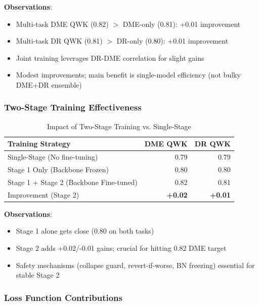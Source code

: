 \textbf{Observations}:
\begin{itemize}
    \item Multi-task DME QWK (0.82) $>$ DME-only (0.81): +0.01 improvement
    \item Multi-task DR QWK (0.81) $>$ DR-only (0.80): +0.01 improvement
    \item Joint training leverages DR-DME correlation for slight gains
    \item Modest improvements; main benefit is single-model efficiency (not bulky DME+DR ensemble)
\end{itemize}

\subsubsection{Two-Stage Training Effectiveness}

\begin{table}[H]
\centering
\small
\caption{Impact of Two-Stage Training vs. Single-Stage}
\begin{tabular}{|l|r|r|}
\hline
\textbf{Training Strategy} & \textbf{DME QWK} & \textbf{DR QWK} \\
\hline
Single-Stage (No fine-tuning) & 0.79 & 0.79 \\
Stage 1 Only (Backbone Frozen) & 0.80 & 0.80 \\
Stage 1 + Stage 2 (Backbone Fine-tuned) & 0.82 & 0.81 \\
Improvement (Stage 2) & \textbf{+0.02} & \textbf{+0.01} \\
\hline
\end{tabular}
\end{table}

\textbf{Observations}:
\begin{itemize}
    \item Stage 1 alone gets close (0.80 on both tasks)
    \item Stage 2 adds +0.02/-0.01 gains; crucial for hitting 0.82 DME target
    \item Safety mechanisms (collapse guard, revert-if-worse, BN freezing) essential for stable Stage 2
\end{itemize}

\subsubsection{Loss Function Contributions}

